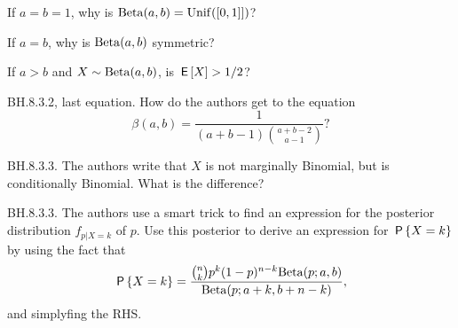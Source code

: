 \begin{exercise}
If $a=b=1$, why is $\Beta{a,b}=\Unif{[0,1]]}$?
\begin{hint}
\end{hint}
\begin{solution}
\end{solution}
\end{exercise}


\begin{exercise}
If $a=b$, why is $\Beta{a,b}$ symmetric?
\begin{hint}
\end{hint}
\begin{solution}
\end{solution}
\end{exercise}

\begin{exercise}
If $a>b$ and  $X\sim\Beta{a,b}$, is $\E X > 1/2$?
\begin{hint}
\end{hint}
\begin{solution}
\end{solution}
\end{exercise}

\begin{exercise}
BH.8.3.2, last equation. How do the authors get to the equation
\begin{equation*}
\beta(a,b) = \frac{1}{(a+b-1) {a+b-2\choose a-1}}?
\end{equation*}
\begin{hint}
\end{hint}
\begin{solution}
\end{solution}
\end{exercise}

\begin{exercise}
BH.8.3.3. The authors write that $X$ is not marginally Binomial, but is conditionally Binomial. What is the difference?
\begin{hint}
\end{hint}
\begin{solution}
\end{solution}
\end{exercise}

\begin{exercise}
BH.8.3.3. The authors use a smart trick to find an expression for the posterior distribution $f_{p|X=k}$ of $p$. Use this posterior to derive an expression for $\P{X=k}$ by using the fact that
\begin{equation*}
\P{X=k} = \frac{{n\choose k} p^{k}(1-p)^{n-k} \Beta{p;a,b}}{\Beta{p;a+k, b+n-k}},
\end{equation*}
and simplyfing the RHS.
\begin{hint}
\end{hint}
\begin{solution}
\end{solution}
\end{exercise}

